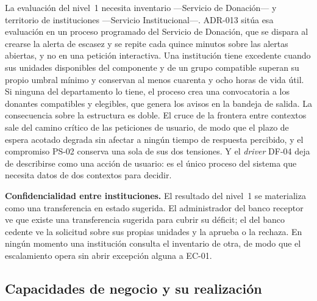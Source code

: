 \documentclass[11pt,a4paper]{article}
\begin{document}
La evaluación del nivel~1 necesita inventario ---Servicio de Donación--- y territorio de instituciones ---Servicio Institucional---. ADR-013 sitúa esa evaluación en un proceso programado del Servicio de Donación, que se dispara al crearse la alerta de escasez y se repite cada quince minutos sobre las alertas abiertas, y no en una petición interactiva. Una institución tiene excedente cuando sus unidades disponibles del componente y de un grupo compatible superan su propio umbral mínimo y conservan al menos cuarenta y ocho horas de vida útil. Si ninguna del departamento lo tiene, el proceso crea una convocatoria a los donantes compatibles y elegibles, que genera los avisos en la bandeja de salida. La consecuencia sobre la estructura es doble. El cruce de la frontera entre contextos sale del camino crítico de las peticiones de usuario, de modo que el plazo de espera acotado degrada sin afectar a ningún tiempo de respuesta percibido, y el compromiso PS-02 conserva una sola de sus dos tensiones. Y el \emph{driver} DF-04 deja de describirse como una acción de usuario: es el único proceso del sistema que necesita datos de dos contextos para decidir.

\vspace{0.2cm}
\noindent\textbf{Confidencialidad entre instituciones.} El resultado del nivel~1 se materializa como una transferencia en estado sugerida. El administrador del banco receptor ve que existe una transferencia sugerida para cubrir su déficit; el del banco cedente ve la solicitud sobre sus propias unidades y la aprueba o la rechaza. En ningún momento una institución consulta el inventario de otra, de modo que el escalamiento opera sin abrir excepción alguna a EC-01.

\subsection{Capacidades de negocio y su realización}
\end{document}
